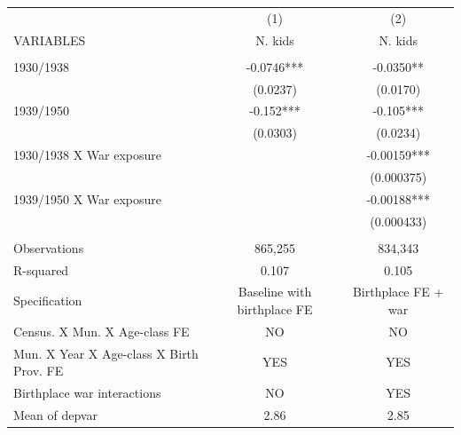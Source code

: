 \begin{tabular}{lcc} \hline
 & (1) & (2) \\
VARIABLES & N. kids & N. kids \\ \hline
 &  &  \\
1930/1938 & -0.0746*** & -0.0350** \\
 & (0.0237) & (0.0170) \\
1939/1950 & -0.152*** & -0.105*** \\
 & (0.0303) & (0.0234) \\
1930/1938 X War exposure &  & -0.00159*** \\
 &  & (0.000375) \\
1939/1950 X War exposure &  & -0.00188*** \\
 &  & (0.000433) \\
 &  &  \\
Observations & 865,255 & 834,343 \\
R-squared & 0.107 & 0.105 \\
Specification & Baseline with birthplace FE & Birthplace FE + war \\
Census. X Mun. X Age-class FE & NO & NO \\
Mun. X Year X Age-class X Birth Prov. FE & YES & YES \\
Birthplace war interactions & NO & YES \\
 Mean of depvar & 2.86 & 2.85 \\ \hline
\end{tabular}
